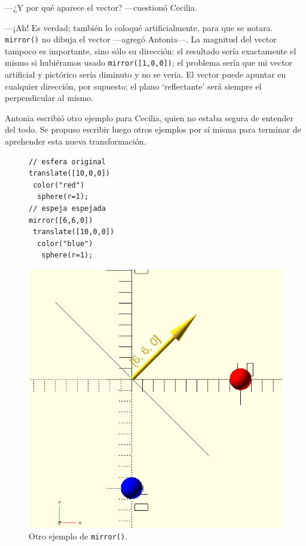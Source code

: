    ---¿Y por qué aparece el vector? ---cuestionó Cecilia.

   ---¡Ah! Es verdad; también lo coloqué artificialmente, para que se
   notara. \lstinline!mirror()! no dibuja el vector ---agregó
   An\-to\-\mbox{nia---.} La magnitud del vector tampoco es
   importante, sino sólo su dirección: el resultado sería exactamente
   el mismo si hubiéramos usado \lstinline!mirror([1,0,0])!; el
   problema sería que mi vector artificial y pictórico sería diminuto
   y no se vería. El vector puede apuntar en cualquier dirección, por
   supuesto; el plano `reflectante' será siempre el perpendicular al
   mismo.

   Antonia escribió otro ejemplo para Cecilia, quien no estaba segura
   de entender del todo. Se propuso escribir luego otros ejemplos por
   sí misma para terminar de aprehender esta nueva transformación.

   \begin{figure}[ht]
\begin{minipage}[]{.49\textwidth}     
   \begin{lstlisting}
// esfera original     
translate([10,0,0])
 color("red")
  sphere(r=1);
// espeja espejada 
mirror([6,6,0])
 translate([10,0,0])
  color("blue")
   sphere(r=1);
   \end{lstlisting}
 \end{minipage}
 \begin{minipage}[]{.5\textwidth}
   \centering
   \includegraphics[width=1\textwidth]{imagenes/mirror-2}
 \end{minipage}
 \caption{Otro ejemplo de \lstinline!mirror()!.}
     \label{fig:mirror-2}
   \end{figure}

